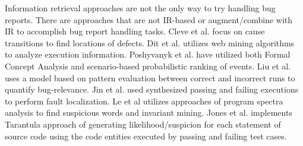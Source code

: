 Information retrieval approaches are not the only way to try handling bug reports.  There are approaches that are not IR-based or augment/combine with IR to accomplish bug report handling tasks.  Cleve et al. \cite{Cleve:2005:LCP:1062455.1062522} focus on cause transitions to find locations of defects.  Dit et al. \cite{Dit:2013:IIR:2436118.2436134} utilizes web mining algorithms to analyze execution information.  Poshyvanyk et al. \cite{Poshyvanyk:2013:CLU:2377656.2377660, Poshyvanyk:2007:FLU:1263152.1263534} have utilized both Formal Concept Analysis and scenario-based probabilistic ranking of events.  Liu et al. \cite{Liu:2005:SSM:1081706.1081753} uses a model based on pattern evaluation between correct and incorrect runs to quantify bug-relevance.  Jin et al. \cite{Jin:2013:FFL:2483760.2483763} used synthesized passing and failing executions to perform fault localization.  Le et al \cite{Le:2015:IRS:2786805.2786880, B.Le:2016:LBF:2931037.2931049} utilizes approaches of program spectra analysis to find suspicious words and invariant mining.  Jones et al. \cite{Jones:2005:EET:1101908.1101949} implements Tarantula approach of generating likelihood/suspicion for each statement of source code using the code entities executed by passing and failing test cases.


